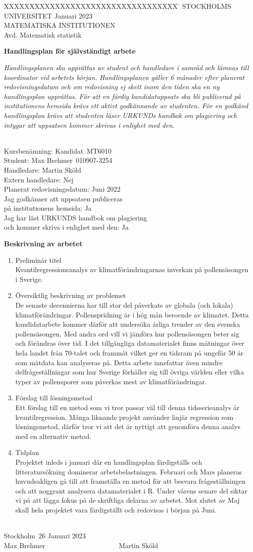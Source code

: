 \documentclass[a4paper,11pt]{article}
\newcommand{\datum}{26 Januari 2023}               %
\newcommand{\kurskod}{MT6010}                      %
\newcommand{\student}{Max Brehmer}              %
\newcommand{\pnr}{010907-3254}                       %
\newcommand{\handledare}{Martin Sköld}            %
\newcommand{\exthandledare}{Nej}                     %
\newcommand{\redovisningsdatum}{Juni 2022}       %
\newcommand{\webbpublicering}{Ja}	%
\newcommand{\urkund}{Ja}	%
\newcommand{\beskr}{
\begin{enumerate}
\item Preliminär titel\\
Kvantilregressionsanalys av klimatförändringarnas inverkan på pollensäsongen i Sverige.
\item Översiktlig beskrivning av problemet \\
De senaste decennierna har till stor del påverkats av globala (och lokala) klimatförändringar. Pollenspridning är i hög mån beroende av klimatet. Detta kandidatarbete kommer därför att undersöka årliga trender av den svenska pollensäsongen. Med andra ord vill vi jämföra hur pollensäsongen beter sig och förändras över tid. I det tillgängliga datamaterialet finns mätningar över hela landet från 70-talet och frammåt vilket ger en tidsram på ungefär 50 år som mätdata kan analyseras på. Detta arbete innefattar även mindre delfrågeställningar som hur Sverige förhåller sig till övriga världen eller vilka typer av pollensporer som påverkas mest av klimatförändringar.
\item Förslag till lösningsmetod \\
Ett förslag till en metod som vi tror passar väl till denna tidsserieanalys är kvantilregression. Många liknande projekt använder linjär regression som lösningsmetod, därför tror vi att det är nyttigt att genomföra denna analys med en alternativ metod.
\item Tidplan \\
Projektet inleds i januari där en handlingsplan färdigställs och litteratursökning dominerar arbetsbelastningen. Februari och Mars planeras huvudsakligen gå till att framställa en metod för att besvara frågeställningen och att noggrant analysera datamaterialet i R. Under vårens senare del siktar vi på att lägga fokus på de skriftliga delarna av arbetet. Mot slutet av Maj skall hela projektet vara färdigställt och redovisas i början på Juni.
\\ \\
\end{enumerate}
}
\begin{document}
 
\begin{tabbing}
XXXXXXXXXXXXXXXXXXXXXXXXXXXXXXXXXX \=       \kill
STOCKHOLMS UNIVERSITET	     \> \datum       \\
MATEMATISKA INSTITUTIONEN     \\
Avd. Matematisk statistik     \\
\end{tabbing}
\medskip
\begin{center} \large \textbf {Handlingsplan för självständigt arbete} \end{center} 
\textit{ \small Handlingsplanen ska upprättas av student och handledare i samråd och lämnas till koordinator vid arbetets början. Handlingsplanen gäller 6 månader efter planerat redovisningsdatum och om redovisning ej skett inom den tiden ska en ny handlingsplan upprättas. För att en färdig kandidatuppsats ska bli publicerad på institutionens hemsida krävs ett aktivt godkännande av studenten. För en godkänd handlingsplan krävs att studenten läser URKUNDs handbok om plagiering och intygar att uppsatsen  kommer skrivas  i enlighet med den.}

\begin{normalsize}
\medskip
\begin{tabbing}
 \hspace{22em} \=   \\
Kursbenämning:  \>   Kandidat~\kurskod     \\
Student:    \> \student ~\pnr     \\
Handledare:  \> \handledare \\
Extern handledare: \> \exthandledare \\
Planerat redovisningsdatum: \> \redovisningsdatum  \\
Jag godkänner att uppsatsen publiceras \\ på institutionens hemsida: \> \webbpublicering  \\
Jag har läst URKUNDS handbok om plagiering\\ och kommer skriva i enlighet med den: \> \urkund  \\
\end{tabbing} 
\textbf{Beskrivning av arbetet}
\medskip
\beskr 
Stockholm\ \datum \\[30 mm]
\student     ~~~~~~~~~~~~~~~~~~~~~    \handledare



\end{normalsize}
\end{document}
